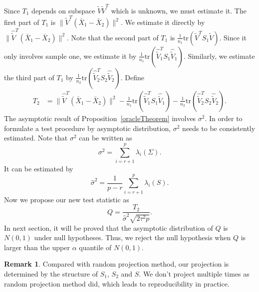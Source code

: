 \documentclass[review]{elsarticle}
\theoremstyle{plain}
\theoremstyle{definition}
\newtheorem{remark}{\quad\quad Remark}
\theoremstyle{remark}
\begin{document}
Since $T_1$ depends on subspace $\tilde{V}\tilde{V}^T$ which is unknown, we must estimate it.
The first part of $T_1$ is $\|\tilde{V}^T (\bar{X}_1-\bar{X}_2)\|^2$.
We estimate it directly by $\|\hat{\tilde{V}}^T (\bar{X}_1-\bar{X}_2)\|^2$.
Note that the second part of $T_1$ is $\frac{1}{n_1}\mathrm{tr}(\tilde{V}^T S_1\tilde{V})$. Since it only involves sample one,
we estimate it by $\frac{1}{n_1}\mathrm{tr}(\hat{\tilde{V}}_1^T S_1\hat{\tilde{V}}_1)$. Similarly, we estimate the third part of $T_1$ by $\frac{1}{n_2}\mathrm{tr}(\hat{\tilde{V}}_2^T S_2\hat{\tilde{V}}_2)$.
Define
\begin{equation*}
\begin{aligned}
    T_2&=\|\hat{\tilde{V}}^T(\bar{X}_1-\bar{X}_2)\|^2-\frac{1}{n_1}\mathrm{tr}(\hat{\tilde{V}}_1^T S_1\hat{\tilde{V}}_1)-\frac{1}{n_2}\mathrm{tr}(\hat{\tilde{V}}_2^T S_2\hat{\tilde{V}}_2).
\end{aligned}
\end{equation*}
The asymptotic result of Proposition~\ref{oracleTheorem} involves $\sigma^2$.
In order to formulate a test procedure by asymptotic distribution, $\sigma^2$ needs to be consistently estimated.
Note that $\sigma^2$ can be written as
\begin{equation}\label{jjjVariance}
    \sigma^2=\sum_{i=r+1}^{p}\lambda_i(\Sigma).
\end{equation}
It can be estimated by
\begin{equation*}
    \hat{\sigma}^2=\frac{1}{p-r}\sum_{i=r+1}^{p} \lambda_i(S).
\end{equation*}
Now we propose our new test statistic as
\begin{equation}\label{myTest}
    Q=\frac{T_2}{\hat{\sigma}^2\sqrt{2\tau^2 p}}.
\end{equation}
In next section, it will be proved that  the asymptotic distribution of $Q$ is $N(0,1)$ under null hypotheses. Thus, we reject the null hypothesis when $Q$ is larger than the upper $\alpha$ quantile of $N(0,1)$.

\begin{remark}
    Compared with random projection method, our projection is determined by the structure of $S_1$, $S_2$ and $S$.
    We don't  project multiple times as random projection method did, which leads to reproducibility in practice.
\end{remark}
\end{document}
